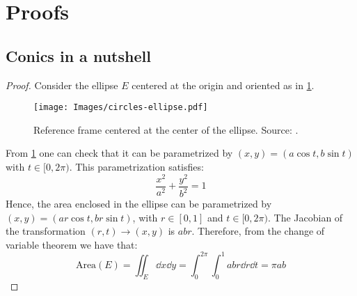 \documentclass[../main.tex]{subfiles}
\begin{document}
\section{Proofs}\label{sec:proofs_appendix}
\subsection{Conics in a nutshell}\label{sec:app1}

\ellipsearea*
\begin{proof}
  Consider the ellipse $E$ centered at the origin and oriented as in \cref{fig:circle-ellipse}.
  \begin{figure}[htbp]
    \centering
    \texttt{[image: Images/circles-ellipse.pdf]}
    \caption{Reference frame centered at the center of the ellipse. Source: \cite{wiki:conic-ellipse}.}
    \label{fig:circle-ellipse}
  \end{figure}

  From \cref{fig:circle-ellipse} one can check that it can be parametrized by $(x,y)=(a\cos t,b\sin t)$ with $ t\in[0,2\pi)$. This parametrization satisfies:
  \begin{equation}
    \frac{x^2}{a^2}+\frac{y^2}{b^2}=1
  \end{equation}
  Hence, the area enclosed in the ellipse can be parametrized by $(x, y)=(ar\cos t,br\sin t)$, with $r\in[0,1]$ and $t\in[0,2\pi)$. The Jacobian of the transformation $(r,t)\to (x,y)$ is $abr$. Therefore, from the change of variable theorem we have that:
  \begin{equation}
    \mathrm{Area}(E)=\iint_E\dd{x}\dd{y}=\int_{0}^{2\pi}\int_{0}^{1}abr\dd{r}\dd{t}=\pi ab
  \end{equation}
\end{proof}
\end{document}
